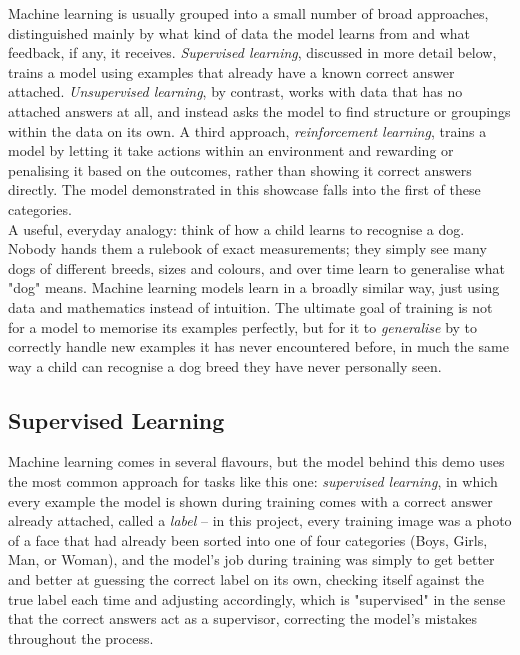 \documentclass[11 pt , a 4 paper ]{article}
\theoremstyle{definition}
\begin{document}
\noindent Machine learning is usually grouped into a small number of broad approaches, distinguished mainly by what kind of data the model learns from and what feedback, if any, it receives. \emph{Supervised learning}, discussed in more detail below, trains a model using examples that already have a known correct answer attached. \emph{Unsupervised learning}, by contrast, works with data that has no attached answers at all, and instead asks the model to find structure or groupings within the data on its own. A third approach, \emph{reinforcement learning}, trains a model by letting it take actions within an environment and rewarding or penalising it based on the outcomes, rather than showing it correct answers directly. The model demonstrated in this showcase falls into the first of these categories.\\
 
\noindent A useful, everyday analogy: think of how a child learns to recognise a dog. Nobody hands them a rulebook of exact measurements; they simply see many dogs of different breeds, sizes and colours, and over time learn to generalise what "dog" means. Machine learning models learn in a broadly similar way, just using data and mathematics instead of intuition. The ultimate goal of training is not for a model to memorise its examples perfectly, but for it to \emph{generalise} by to correctly handle new examples it has never encountered before, in much the same way a child can recognise a dog breed they have never personally seen.
 
\subsection{Supervised Learning}
 
Machine learning comes in several flavours, but the model behind this demo uses the most common approach for tasks like this one: \emph{supervised learning}, in which every example the model is shown during training comes with a correct answer already attached, called a \emph{label} -- in this project, every training image was a photo of a face that had already been sorted into one of four categories (Boys, Girls, Man, or Woman), and the model's job during training was simply to get better and better at guessing the correct label on its own, checking itself against the true label each time and adjusting accordingly, which is "supervised" in the sense that the correct answers act as a supervisor, correcting the model's mistakes throughout the process.
 
\end{document}
